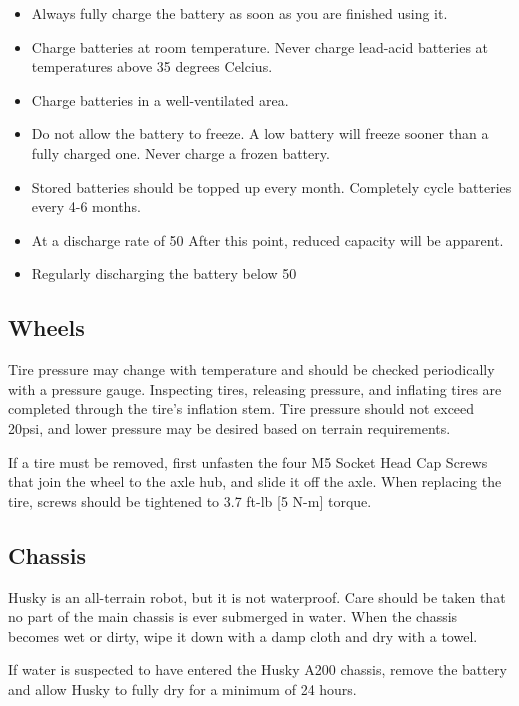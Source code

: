\documentclass[]{clearpath-latex/clearpath-manual}
\begin{document}
\begin{itemize}
	\item Always fully charge the battery as soon as you are finished using it.
	\item Charge batteries at room temperature.  Never charge lead-acid batteries at temperatures above 35 degrees Celcius.
	\item Charge batteries in a well-ventilated area.
	\item Do not allow the battery to freeze.  A low battery will freeze sooner than a fully charged one.  Never charge a frozen battery.
	\item Stored batteries should be topped up every month.  Completely cycle batteries every 4-6 months.
	\item At a discharge rate of 50%
	After this point, reduced capacity will be apparent.
	\item Regularly discharging the battery below 50%
\end{itemize}

\subsection{Wheels}
Tire pressure may change with temperature and should be checked periodically with a pressure gauge. 
Inspecting tires, releasing pressure, and inflating tires are completed through the tire’s inflation stem. 
Tire pressure should not exceed 20psi, and lower pressure may be desired based on terrain requirements.

If a tire must be removed, first unfasten the four M5 Socket Head Cap Screws that join the wheel to the axle hub,
and slide it off the axle. When replacing the tire, screws should be tightened to 3.7 ft-lb [5 N-m] torque.

\subsection{Chassis}
Husky is an all-terrain robot, but it is not waterproof. Care should be taken that no part of the main 
chassis is ever submerged in water. When the chassis becomes wet or dirty, wipe it down with a damp cloth 
and dry with a towel.

If water is suspected to have entered the Husky A200 chassis, remove the battery and allow Husky to fully dry for a minimum of 24 hours.
\end{document}
